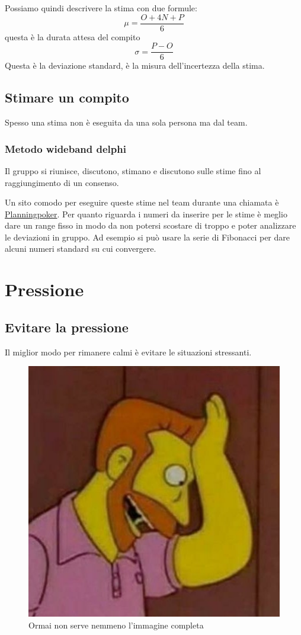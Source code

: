 \documentclass[11pt,a4paper]{book}
\begin{document}
Possiamo quindi descrivere la stima con due formule:
$$\mu=\dfrac{O+4N+P}{6}$$
questa è la durata attesa del compito
$$\sigma=\dfrac{P-O}{6}$$
Questa è la deviazione standard, è la misura dell'incertezza della stima.

\section{Stimare un compito}
Spesso una stima non è eseguita da una sola persona ma dal team.
\subsection{Metodo wideband delphi}
Il gruppo si riunisce, discutono, stimano e discutono sulle stime fino al raggiungimento di un consenso.

Un sito comodo per eseguire queste stime nel team durante una chiamata è \href{https://www.planningpoker.com/}{Planningpoker}. Per quanto riguarda i numeri da inserire per le stime è meglio dare un range fisso in modo da non potersi scostare di troppo e poter analizzare le deviazioni in gruppo. Ad esempio si può usare la serie di Fibonacci per dare alcuni numeri standard su cui convergere.

\chapter{Pressione}
\section{Evitare la pressione}
Il miglior modo per rimanere calmi è evitare le situazioni stressanti.
\begin{figure}[h!]
	\begin{center}
		\includegraphics[scale=0.4]{img/004.jpg}
		\caption{Ormai non serve nemmeno l'immagine completa}
		\label{fig: 004}
	\end{center}
\end{figure}
\end{document}
